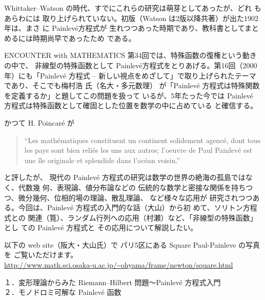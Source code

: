 \documentclass[uplatex,dvipdfmx]{jlreq}
\newcommand{\Painleve}{Painlevé}
\begin{document}
Whittaker--Watson の時代、すでにこれらの研究は萌芽としてあったが、どれ
もあらわには
取り上げられていない。初版（Watson は2版以降共著）が出た1902年は、まさ
に \Painleve 方程式が
生れつつあった時期であり、教科書としてまとめるには時期尚早であったため
である。

ENCOUNTER with MATHEMATICS 第34回では、特殊函数の復権という動きの中で、
非線型の特殊函数として
\Painleve 方程式をとりあげる。第16回（2000年）にも「Painlevé 方程式
-- 新しい視点をめざして」で取り上げられたテーマであり、そこでも梅村浩
氏（名大・多元数理）
が「Painlevé 方程式は特殊関数を定義するか」と題してこの問題を扱って
いるが、5年たった今では
Painlevé 方程式は特殊函数として確固とした位置を数学の中に占めている
と確信する。

かつて H. Poincaré が
\begin{quote}
``Les mathématiques constituent un
continent
solidement agencé, dont tous les pays sont bien reliés les
uns aux
autres; l'oeuvre de Paul Painlevé est une île originale et
splendide
dans l'océan voisin.''
\end{quote}
と評したが、
現代の Painlevé 方程式の研究は数学の世界の絶海の孤島ではなく、代数幾
何、表現論、値分布論などの
伝統的な数学と密接な関係を持ちつつ、微分幾何、位相的場の理論、散乱理論、
など様々な応用が
研究されつつある。今回は、Painlevé 方程式の入門的な話（大山）から初
めて、ソリトン方程式との
関連（筧）、ランダム行列への応用（村瀬）など、「非線型の特殊函数」とし
ての Painlevé 方程式と
その応用について解説したい。

\vspace*{12pt}
以下の web site（阪大・大山氏）で
パリ5区にある Square Paul-Painleve の写真を
ご覧いただけます。\\
\hspace*{\fill}\url{http://www.math.sci.osaka-u.ac.jp/~ohyama/frame/newton/square.html}\hspace*{\fill}

\newpage


\begin{center}
１．変形理論からみた Riemann--Hilbert 問題〜Painlevé 方程式入門\\
２．モノドロミ可解な Painlevé 函数\\[6pt]
\hspace*{\fill}{\large\bfseries 大山 陽介（阪大・情報）}
\end{center}
\end{document}
